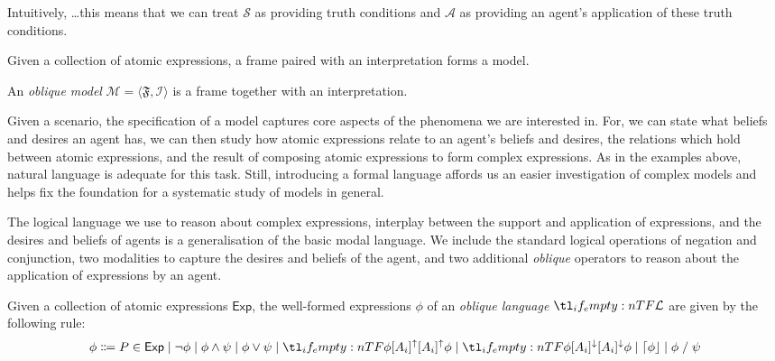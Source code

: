 \documentclass[10pt]{article}
\newcommand{\lattn}{\ensuremath{\lceil}}
\newcommand{\rattn}{\ensuremath{\rfloor}}
\newcommand{\attn}[1]{\ensuremath{\mathord{\lattn{#1}\rattn}}}
\def\ltrans{\mathrel{%
    /%
  }}
\def\bnfsep{\mathrel{%
    |%
  }}
\newcommand{\oframe}[1]{\ensuremath{\mathfrak{#1}}}
\newcommand{\ointp}[1]{\ensuremath{\mathcal{#1}}}
\newcommand{\omodel}[1]{\ensuremath{\mathcal{#1}}}
\begin{document}
{\color{red} Intuitively, \dots this means that we can treat \(\mathcal{S}\) as providing truth conditions and \(\mathcal{A}\) as providing an agent's application of these truth conditions.}

Given a collection of atomic expressions, a frame paired with an interpretation forms a model.

\begin{definition}[Model]
  An \emph{oblique model} \(\omodel{M} = \langle \oframe{F}, \ointp{I}  \rangle\) is a frame together with an interpretation.
\end{definition}

Given a scenario, the specification of a model captures core aspects of the phenomena we are interested in.
For, we can state what beliefs and desires an agent has, we can then study how atomic expressions relate to an agent's beliefs and desires, the relations which hold between atomic expressions, and the result of composing atomic expressions to form complex expressions.
As in the examples above, natural language is adequate for this task.
Still, introducing a formal language affords us an easier investigation of complex models and helps fix the foundation for a systematic study of models in general.

The logical language we use to reason about complex expressions, interplay between the support and application of expressions, and the desires and beliefs of agents is a generalisation of the basic modal language.
We include the standard logical operations of negation and conjunction, two modalities to capture the desires and beliefs of the agent, and two additional \emph{oblique} operators to reason about the application of expressions by an agent.

\begin{definition}
  Given a collection of atomic expressions \(\mathsf{Exp}\), the well-formed expressions \(\phi\) of an \emph{oblique language} \(\olang{}\) are given by the following rule:
  \[
    \phi \Coloneqq P \in \mathsf{Exp} \bnfsep \lnot\phi \bnfsep \phi\land\psi \bnfsep \phi\lor\psi \bnfsep \lattu[A_{i}]{\phi} \bnfsep \lattd[A_{i}]{\phi} \bnfsep \attn{\phi} \bnfsep \phi \ltrans \psi
  \]
\end{definition}
\end{document}
